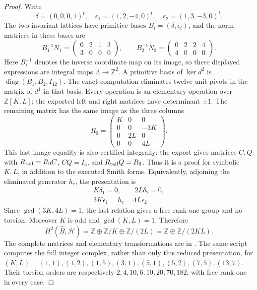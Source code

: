 \begin{proof}
Write
\[
 \delta=(0,0,0,1)^t,\quad
 \epsilon_1=(1,2,-4,0)^t,\quad
 \epsilon_2=(1,3,-3,0)^t.
\]
The two invariant lattices have primitive bases
\(B_i=(\delta,\epsilon_i)\), and the norm matrices in
these bases are
\[
 B_1^{-1}N_1=
 \begin{pmatrix}0&2&1&3\\3&0&0&0\end{pmatrix},
 \qquad
 B_2^{-1}N_2=
 \begin{pmatrix}0&2&2&4\\4&0&0&0\end{pmatrix}.
\]
Here \(B_i^{-1}\) denotes the inverse coordinate map on its
image, so these displayed expressions are integral maps
\(\Lambda\to\mathbb Z^2\).  A primitive basis of
\(\ker d^2\) is \(\operatorname{diag}(B_1,B_2,I_{12})\).
The exact computation eliminates twelve unit pivots in the
matrix of \(d^1\) in that basis.  Every operation is an
elementary operation over \(\mathbb Z[K,L]\); the exported
left and right matrices have determinant \(\pm1\).
The remaining matrix has the same image as the three columns
\[
 R_0=
 \begin{pmatrix}
 K&0&0\\0&0&-3K\\0&2L&0\\0&0&4L
 \end{pmatrix}.
\]
This last image equality is also certified integrally: the
export gives matrices \(C,Q\) with
\(R_{\rm tail}=R_0C\), \(CQ=I_3\), and
\(R_{\rm tail}Q=R_0\).  Thus it is a proof for symbolic
\(K,L\), in addition to the executed Smith forms.
Equivalently, adjoining the eliminated generator \(h_c\),
the presentation is
\[
\begin{gathered}
 K\delta_1=0,\qquad 2L\delta_2=0,\\
 3K\epsilon_1=h_c=4L\epsilon_2.
\end{gathered}
\]
Since \(\gcd(3K,4L)=1\), the last relation gives a free
rank-one group and no torsion.  Moreover \(K\) is odd and
\(\gcd(K,L)=1\).  Therefore
\[
 H^2(\widehat B,\mathcal H)
 =\mathbb Z\oplus\mathbb Z/K\oplus\mathbb Z/(2L)
 =\mathbb Z\oplus\mathbb Z/(2KL).
\]
The complete matrices and elementary transformations are in
.
The same script computes the full integer complex, rather than
only this reduced presentation, for
\((K,L)=(1,1),(1,2),(1,5),(3,1),(5,1),(5,2),(7,5),(13,7)\).
Their torsion orders are respectively
\(2,4,10,6,10,20,70,182\), with free rank one in every case.


\end{proof}
